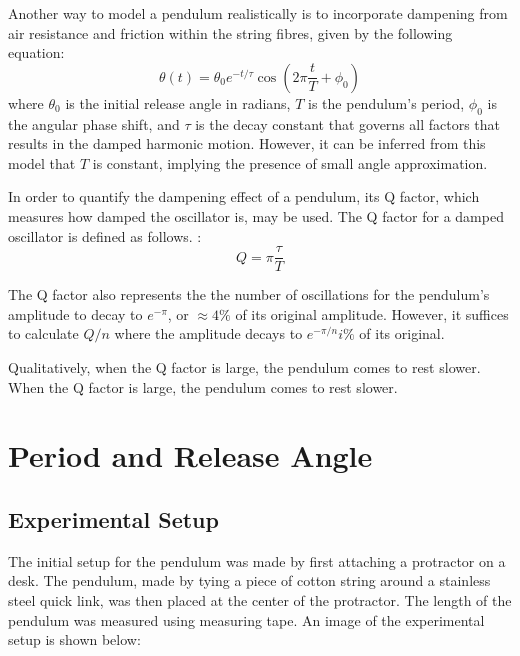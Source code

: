 \documentclass[12pt]{article}
\begin{document}
Another way to model a pendulum realistically is to incorporate dampening from air resistance and friction within the string fibres, given by the following equation:
\begin{equation} \label{eq:eq3}
    \theta(t) = \theta_0 e^{-{t/\tau}} \cos\left(2\pi\frac{t}{T} + \phi_0\right)
\end{equation}
where $\theta_0$ is the initial release angle in radians, $T$ is the pendulum's period, $\phi_0$ is the angular phase shift, and $\tau$ is the decay constant that governs all factors that results in the damped harmonic motion. However, it can be inferred from this model that $T$ is constant, implying the presence of small angle approximation.

In order to quantify the dampening effect of a pendulum, its Q factor, which measures how damped the oscillator is, may be used. The Q factor for a damped oscillator is defined as follows. \cite{pnp-physics}:
\begin{equation} \label{eq:eq4}
    Q = \pi\frac{\tau}{T}
\end{equation}

The Q factor also represents the the number of oscillations for the pendulum's amplitude to decay to $e^{-\pi}$, or $\approx 4\%$ of its original amplitude. However, it suffices to calculate $Q/n$ where the amplitude decays to $e^{-\pi/n}i\%$ of its original.

Qualitatively, when the Q factor is large, the pendulum comes to rest slower. When the Q factor is large, the pendulum comes to rest slower.

\section{Period and Release Angle}

\subsection{Experimental Setup}
The initial setup for the pendulum was made by first attaching a protractor on a desk. The pendulum, made by tying a piece of cotton string around a stainless steel quick link, was then placed at the center of the protractor. The length of the pendulum was measured using measuring tape. An image of the experimental setup is shown below:
\end{document}
